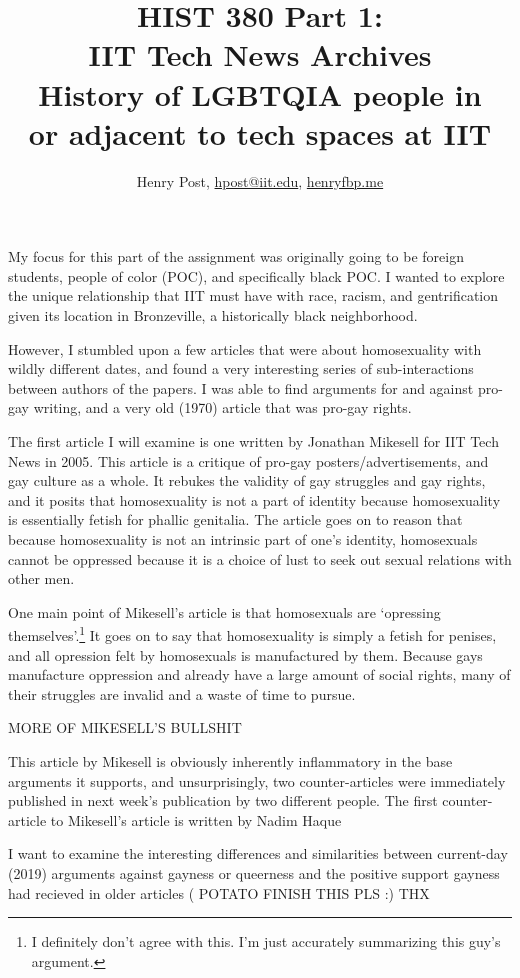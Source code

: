 \documentclass[a4paper,12pt]{article}
\title{HIST 380 Part 1: \\ IIT Tech News Archives \\ History of LGBTQIA people in \\ or adjacent to tech spaces at IIT}
\author{Henry Post, \url{hpost@iit.edu}, \url{henryfbp.me}}
\begin{document}
\maketitle

\newpage

	My focus for this part of the assignment was originally going to be foreign students, people of color (POC), and specifically black POC. I wanted to explore the unique relationship that IIT must have with race, racism, and gentrification given its location in Bronzeville, a historically black neighborhood. 

	However, I stumbled upon a few articles that were about homosexuality with wildly different dates, and found a very interesting series of sub-interactions between authors of the papers. I was able to find arguments for and against pro-gay writing, and a very old (1970) article that was pro-gay rights.

	The first article \cite{antigay} I will examine is one written by Jonathan Mikesell for IIT Tech News in 2005. This article is a critique of pro-gay posters/advertisements, and gay culture as a whole. It rebukes the validity of gay struggles and gay rights, and it posits that homosexuality is not a part of identity because homosexuality is essentially fetish for phallic genitalia. The article goes on to reason that because homosexuality is not an intrinsic part of one's identity, homosexuals cannot be oppressed because it is a choice of lust to seek out sexual relations with other men.

	One main point of Mikesell's article is that homosexuals are `opressing themselves'.\footnote{I definitely don't agree with this. I'm just accurately summarizing this guy's argument.} It goes on to say that homosexuality is simply a fetish for penises, and all opression felt by homosexuals is manufactured by them. Because gays manufacture oppression and already have a large amount of social rights, many of their struggles are invalid and a waste of time to pursue.

	MORE OF MIKESELL'S BULLSHIT
	
	This article by Mikesell is obviously inherently inflammatory in the base arguments it supports, and unsurprisingly, two counter-articles were immediately published in next week's publication by two different people.  The first counter-article to Mikesell's article is written by Nadim Haque\cite{counterantigay1}

	I want to examine the interesting differences and similarities between current-day (2019) arguments against gayness or queerness and the positive support gayness had recieved in older articles ( POTATO FINISH THIS PLS :) THX
\end{document}
